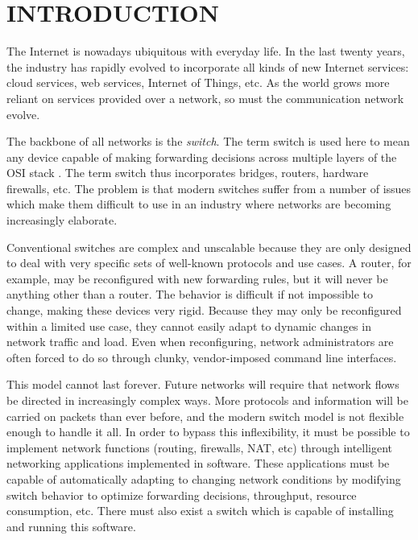 \chapter{INTRODUCTION} \label{ch:intro}

%
%


The Internet is nowadays ubiquitous with everyday life. In the last twenty
years,
the industry has rapidly evolved to incorporate all kinds of new Internet
services:
cloud services, web services, Internet of Things, etc. As the world grows
more reliant on services provided over a network, so must the communication network evolve.

The backbone of all networks is the \emph{switch}. The term switch is used here to mean any device capable of making forwarding decisions across multiple layers of the OSI stack \cite{osi_model}. The term switch thus incorporates bridges, routers, hardware firewalls, etc.
The problem is that modern switches suffer from a number of issues which make them difficult to use in an industry where networks are becoming increasingly elaborate.

Conventional switches are complex and unscalable because they are only designed to deal with very specific sets of well-known protocols and use cases. A router, for example, may be reconfigured with new forwarding rules, but it will never be anything other than a router. The behavior is difficult if not impossible to change, making these devices very rigid.
Because they may only be reconfigured within a limited use case, they cannot easily adapt to dynamic changes in network traffic and load.
Even when reconfiguring, network administrators are often forced to do so through clunky, vendor-imposed command line interfaces.

This model cannot last forever. Future networks will require that network flows be directed in increasingly complex ways. More protocols and information will be carried on packets than ever before, and the modern switch model is not flexible enough to handle it all.
In order to bypass this inflexibility, it must be possible to implement network functions (routing, firewalls, NAT, etc) through intelligent networking applications implemented in software.
These applications must be capable of automatically adapting to changing network conditions by modifying switch behavior to optimize forwarding decisions, throughput, resource consumption, etc.
There must also exist a switch which is capable of installing and running this software.

